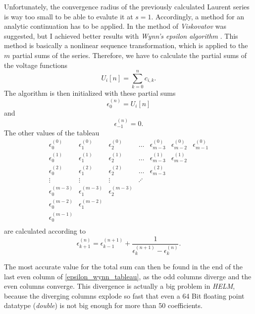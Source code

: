 Unfortunately, the convergence radius of the previously calculated Laurent series is way too small to be able to evalute it at $s = 1$. Accordingly, a method for an analytic continuation has to be applied. In \citep{helmPatentSept2009} the method of \emph{Viskovatov} was suggested, but I achieved better results with \emph{Wynn's epsilon algorithm} \citep{epsilonWynn}. This method is basically a nonlinear sequence transformation, which is applied to the $m$ partial sums of the series. Therefore, we have to calculate the partial sums of the voltage functions
\begin{equation}
	U_i[n] = \sum_{k = 0}^n c_{i,k}.
\end{equation}
The algorithm is then initialized with these partial sums
\begin{equation}
	\epsilon_0^{(n)} = U_i[n]
\end{equation}
and
\begin{equation}
	\epsilon_{-1}^{(n)} = 0.
\end{equation}
The other values of the tableau
\begin{equation}
	\begin{matrix}
	\epsilon_0^{(0)}	& \epsilon_1^{(0)}		& \epsilon_2^{(0)}		& \hdots 	& \epsilon_{m-3}^{(0)} 	& \epsilon_{m-2}^{(0)} 	& \epsilon_{m-1}^{(0)} \\
	\epsilon_0^{(1)}	& \epsilon_1^{(1)}		& \epsilon_2^{(1)}		& \hdots 	& \epsilon_{m-3}^{(1)} 	& \epsilon_{m-2}^{(1)} \\
	\epsilon_0^{(2)}	& \epsilon_1^{(2)}		& \epsilon_2^{(2)}		& \hdots 	& \epsilon_{m-3}^{(2)} \\
	\vdots				& \vdots				& \vdots				& \iddots \\
	\epsilon_0^{(m-3)}	& \epsilon_1^{(m-3)}	& \epsilon_2^{(m-3)}	& \\
	\epsilon_0^{(m-2)}	& \epsilon_1^{(m-2)} \\
	\epsilon_0^{(m-1)} \\
	\end{matrix}
	\label{eq:epsilon_wynn_tableau}
\end{equation}
are calculated according to
\begin{equation}
	\epsilon_{k + 1}^{(n)} = \epsilon_{k - 1}^{(n + 1)} + \frac{1}{\epsilon_{k}^{(n + 1)} - \epsilon_{k}^{(n)}}.
	\label{eq:epsilon_wynn}
\end{equation}

The most accurate value for the total sum can then be found in the end of the last even column of \eqref{epsilon_wynn_tableau}, as the odd columns diverge and the even columns converge. This divergence is actually a big problem in \emph{HELM}, because the diverging columns explode so fast that even a 64 Bit floating point datatype (\emph{double}) is not big enough for more than 50 coefficients.

